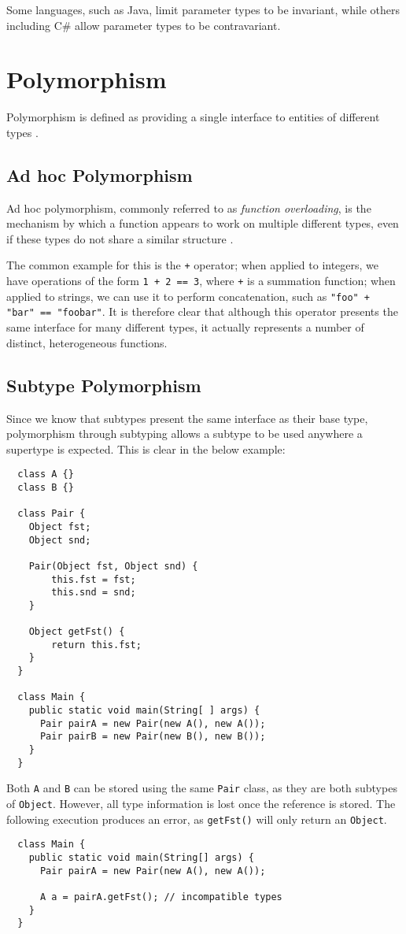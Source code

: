 Some languages, such as Java, limit parameter types to be invariant, while others including C\# allow parameter types to be contravariant.

\section{Polymorphism} \label{polymorphism}

Polymorphism is defined as providing a single interface to entities of different types \cite{Stroustrup}. 

\subsection{Ad hoc Polymorphism}

Ad hoc polymorphism, commonly referred to as \textit{function overloading}, is the mechanism by which a function appears to work on multiple different types, even if these types do not share a similar structure \cite{Cardelli1985}. 

The common example for this is the \texttt{+} operator; when applied to integers, we have operations of the form \texttt{1 + 2 == 3}, where \texttt{+} is a summation function; when applied to strings, we can use it to perform concatenation, such as \texttt{"foo" + "bar" == "foobar"}. It is therefore clear that although this operator presents the same interface for many different types, it actually represents a number of distinct, heterogeneous functions.

\subsection{Subtype Polymorphism}

Since we know that subtypes present the same interface as their base type, polymorphism through subtyping allows a subtype to be used anywhere a supertype is expected. This is clear in the below example:
\begin{verbatim}
  class A {}
  class B {}

  class Pair {
    Object fst;
    Object snd;
    
    Pair(Object fst, Object snd) {
        this.fst = fst;
        this.snd = snd;
    }
    
    Object getFst() {
        return this.fst;
    }
  }

  class Main {
    public static void main(String[ ] args) {
      Pair pairA = new Pair(new A(), new A());
      Pair pairB = new Pair(new B(), new B());
    }
  }
\end{verbatim}
Both \texttt{A} and \texttt{B} can be stored using the same \texttt{Pair} class, as they are both subtypes of \texttt{Object}. However, all type information is lost once the reference is stored. The following execution produces an error, as \texttt{getFst()} will only return an \texttt{Object}.
\begin{verbatim}
  class Main {
    public static void main(String[] args) {
      Pair pairA = new Pair(new A(), new A());
        
      A a = pairA.getFst(); // incompatible types
    }
  }
\end{verbatim}

